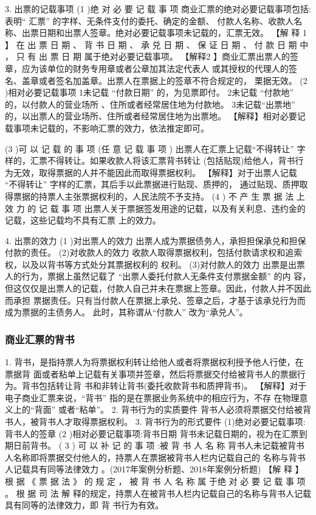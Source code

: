 \documentclass[UTF8,12pt]{ctexart}
\numberwithin{equation}{section} %
\numberwithin{figure}{section}
\numberwithin{table}{section}
\begin{document}
	3. 出票的记载事项
	(1 )绝 对 必 要 记 载 事 项
	商业汇票的绝对必要记载事项包括:表明“ 汇票” 的字样、无条件支付的委托、确定的金额、 付款人名称、收款人名称、出票日期和出票人签章。绝对必要记载事项未记载的，汇票无效。
	【解 释 1 】 在 出 票 日 期 、 背 书 日 期 、 承 兑 日 期 、 保 证 日 期 、 付 款 日 期 中 ， 只 有 出 票 日 期 属于绝对必要记载事项。
	【解释2 】商业汇票出票人的签章，应为该单位的财务专用章或者公章加其法定代表人 或其授权的代理人的签名、盖章或者签名加盖章。出票人在票据上的签章不符合规定的， 栗据无效。
	(2 )相对必要记载事项
	1未记载 “付款日期” 的，为见票即付。
	2未记载 “付款地” 的，以付款人的营业场所 、住所或者经常居住地为付款地。 3未记载“出票地” 的，以出票人的营业场所、住所或者经常居住地为出票地。
	【解释】相对必要记载事项未记载的，不影响汇票的效力，依法推定即可。
	
	(3 )可 以 记 载 的 事 项 (任 意 记 载 事 项 )
	出票人在汇票上记载“不得转让” 字样的，汇票不得转让。如果收款人将该汇票背书转让 (包括贴现)给他人，背书行为无效，取得票据的人并不能因此而取得票据权利。
	【解释】对于出票人记载 “不得转让” 字样的汇票，其后手以此票据进行贴现、质押的， 通过贴现、质押取得票据的持票人主张票据权利的，人民法院不予支持。
	(4 ) 不 产 生 票 据 法 上 效 力 的 记 载 事 项 出票人关于票据签发用途的记载，以及有关利息、违约金的记载，这些记载均不具有汇票 上的效力。
	
	4. 出票的效力
	(1 )对出票人的效力
	出票人成为票据债务人，承担担保承兑和担保付款的责任。
	(2)对收款人的效力 收款人取得票据权利，包括付款请求权和追索权，以及以背书等方式处分其票据权利的 权利。
	(3)对付款人的效力
	出票是出票人的行为，票据上虽然记载了 “出票人委托付款人无条件支付票据金额” 的内 容，但这仅仅是出票人的记载，付款人自己并未在票据上签章。因此，付款人并不因此而承担 票据责任。只有当付款人在票据上承兑、签章之后，才基于该承兑行为而成为票据的主债务人。 此时，其称谓从“付款人” 改为“承兑人”。
	
	
	\subsubsection{商业汇票的背书} 
	1. 背书，是指持票人为将票据权利转让给他人或者将票据权利授予他人行使，在票据背 面或者粘单上记载有关事项并签章，然后将票据交付给被背书人的票据行为。背书包括转让背 书和非转让背书(委托收款背书和质押背书)。
	【解释】对于电子商业汇票来说，“背书” 指的是在票据业务系统中的相应行为，不存 在物理意义上的“背面” 或者“粘单”。
	2. 背书行为的实质要件
	背书人必须将票据交付给被背书人，被背书人才取得票据权利。
	3. 背书行为的形式要件
	(1)绝对必要记载事项:背书人的签章
	(2 )相对必要记载事项:背书日期
	背书未记载日期的，视为在汇票到期日前背书。
	( 3 ) 可 以 补 记 的 事 项 :被 背 书 人 名 称 背书人未记载被背书人名称即将票据交付他人的，持票人在票据被背书人栏内记载自己的 名称与背书人记载具有同等法律效力 。(2017年案例分析题、2018年案例分析题)
	【解 释 】 根 据 《 票 据 法 》 的 规 定 ， 被 背 书 人 名 称 属 于绝 对 必 要 记 载 事 项 。 根 据 司 法 解 释的规定，持票人在被背书人栏内记载自己的名称与背书人记载具有同等的法律效力，即 背 书行为有效。
	
\end{document}
